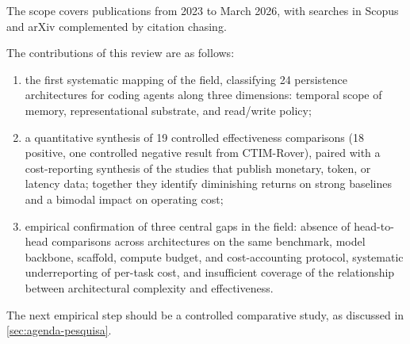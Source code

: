 \noindent The scope covers publications from 2023 to March 2026, with
searches in Scopus and arXiv complemented by citation chasing.

The contributions of this review are as follows:

\begin{enumerate}
  \item the first systematic mapping of the field, classifying 24
    persistence architectures for coding agents along three dimensions:
    temporal scope of memory, representational substrate, and
    read/write policy;
  \item a quantitative synthesis of 19 controlled effectiveness
    comparisons (18 positive, one controlled negative result from
    CTIM-Rover), paired with a cost-reporting synthesis of the studies
    that publish monetary, token, or latency data;
    together they identify diminishing returns on strong baselines and
    a bimodal impact on operating cost;
  \item empirical confirmation of three central gaps in the field:
    absence of head-to-head comparisons across architectures on the
    same benchmark, model backbone, scaffold, compute budget, and
    cost-accounting protocol, systematic underreporting of per-task cost, and
    insufficient coverage of the relationship between architectural
    complexity and effectiveness.
\end{enumerate}

The next empirical step should be a controlled comparative study,
as discussed in \autoref{sec:agenda-pesquisa}.
